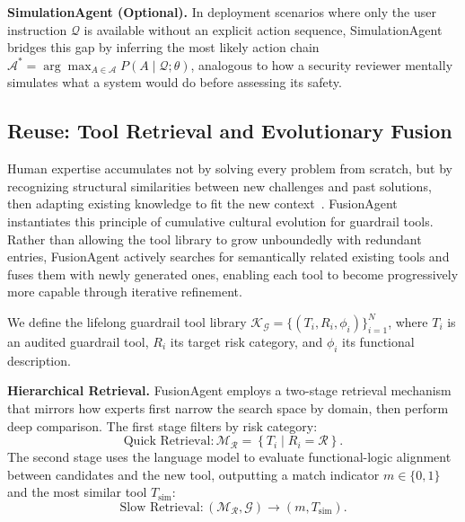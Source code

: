   \noindent\textbf{SimulationAgent (Optional).} In deployment scenarios where only the user instruction $\mathcal{Q}$ is available without an explicit action sequence, SimulationAgent bridges this gap by inferring the
  most likely action chain $\mathcal{A}^* = \arg\max_{A \in \mathcal{A}} P(A \mid \mathcal{Q};\theta)$, analogous to how a security reviewer mentally simulates what a system would do before assessing its safety.


  \subsection{Reuse: Tool Retrieval and Evolutionary Fusion}

  Human expertise accumulates not by solving every problem from scratch, but by recognizing structural similarities between new challenges and past solutions, then adapting existing knowledge to fit the new
  context~\citep{henrich2015secret}. FusionAgent instantiates this principle of cumulative cultural evolution for guardrail tools. Rather than allowing the tool library to grow unboundedly with redundant entries,
  FusionAgent actively searches for semantically related existing tools and fuses them with newly generated ones, enabling each tool to become progressively more capable through iterative refinement.

  We define the lifelong guardrail tool library $\mathcal{K}_{\mathcal{G}} = \{(T_i, R_i, \phi_i)\}_{i=1}^{N}$, where $T_i$ is an audited guardrail tool, $R_i$ its target risk category, and $\phi_i$ its functional
  description.

  \noindent\textbf{Hierarchical Retrieval.} FusionAgent employs a two-stage retrieval mechanism that mirrors how experts first narrow the search space by domain, then perform deep comparison. The first stage filters by
  risk category:
  \begin{equation}
      \text{Quick Retrieval} : \mathcal{M}_{\mathcal{R}} = \left\{ T_i \mid R_i = \mathcal{R} \right\}.
  \end{equation}
  The second stage uses the language model to evaluate functional-logic alignment between candidates and the new tool, outputting a match indicator $m \in \{0, 1\}$ and the most similar tool $T_{\text{sim}}$:
  \begin{equation}
      \text{Slow Retrieval} : (\mathcal{M}_{\mathcal{R}}, \mathcal{G}) \rightarrow (m, T_{\text{sim}}).
  \end{equation}

